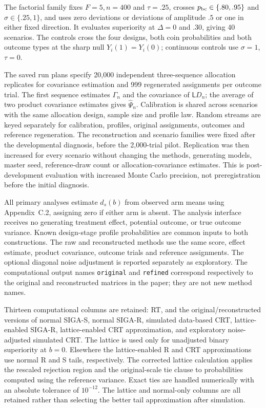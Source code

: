 \documentclass[12pt,a4paper]{article}
\theoremstyle{definition}
\theoremstyle{remark}\newtheorem{remark}{Remark}
\numberwithin{equation}{section}
\begin{document}
The factorial family fixes $F=5,n=400$ and $\tau=.25$, crosses $p_{\rm bc}\in\{.80,.95\}$ and $\sigma\in\{.25,1\}$, and uses zero deviations or deviations of amplitude $.5$ or one in either fixed direction. It evaluates superiority at $\Delta=0$ and $.30$, giving 40 scenarios. The controls cross the four designs, both coin probabilities and both outcome types at the sharp null $Y_i(1)=Y_i(0)$; continuous controls use $\sigma=1$, $\tau=0$.

The saved run plans specify 20,000 independent three-sequence allocation replicates for covariance estimation and 999 regenerated assignments per outcome trial. The first sequence estimates $\Gamma_n$ and the covariance of $\mathsf L D_n$; the average of two product covariance estimates gives $\widehat\Psi_n$. Calibration is shared across scenarios with the same allocation design, sample size and profile law. Random streams are keyed separately for calibration, profiles, original assignments, outcomes and reference regeneration. The reconstruction and scenario families were fixed after the developmental diagnosis, before the 2,000-trial pilot. Replication was then increased for every scenario without changing the methods, generating models, master seed, reference-draw count or allocation-covariance estimates. This is post-development evaluation with increased Monte Carlo precision, not preregistration before the initial diagnosis.

All primary analyses estimate $d_s(b)$ from observed arm means using Appendix~C.2, assigning zero if either arm is absent. The analysis interface receives no generating treatment effect, potential outcome, or true outcome variance. Known design-stage profile probabilities are common inputs to both constructions. The raw and reconstructed methods use the same score, effect estimate, product covariance, outcome trials and reference assignments. The optional diagonal noise adjustment is reported separately as exploratory. The computational output names \texttt{original} and \texttt{refined} correspond respectively to the original and reconstructed matrices in the paper; they are not new method names.

Thirteen computational columns are retained: RT, and the original/reconstructed versions of normal SIGA-S, normal SIGA-R, simulated data-based CRT, lattice-enabled SIGA-R, lattice-enabled CRT approximation, and exploratory noise-adjusted simulated CRT. The lattice is used only for unadjusted binary superiority at $b=0$. Elsewhere the lattice-enabled R and CRT approximations use normal R and S tails, respectively. The corrected lattice calculation applies the rescaled rejection region and the original-scale tie clause to probabilities computed using the reference variance. Exact ties are handled numerically with an absolute tolerance of $10^{-12}$. The lattice and normal-only columns are all retained rather than selecting the better tail approximation after simulation.
\end{document}
